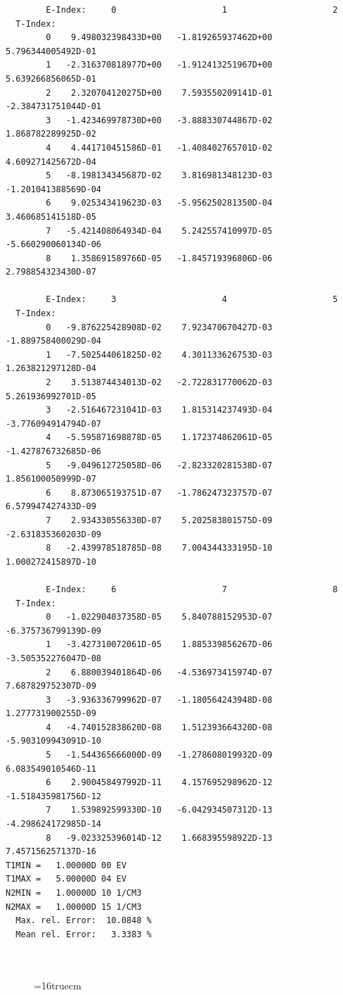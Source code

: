 \documentclass[12pt,dvipdfmx]{article}
\begin{document}
\begin{small}\begin{verbatim}
        E-Index:     0                     1                     2
  T-Index:
        0    9.498032398433D+00   -1.819265937462D+00    5.796344005492D-01
        1   -2.316370818977D+00   -1.912413251967D+00    5.639266856065D-01
        2    2.320704120275D+00    7.593550209141D-01   -2.384731751044D-01
        3   -1.423469978730D+00   -3.888330744867D-02    1.868782289925D-02
        4    4.441710451586D-01   -1.408402765701D-02    4.609271425672D-04
        5   -8.198134345687D-02    3.816981348123D-03   -1.201041388569D-04
        6    9.025343419623D-03   -5.956250281350D-04    3.460685141518D-05
        7   -5.421408064934D-04    5.242557410997D-05   -5.660290060134D-06
        8    1.358691589766D-05   -1.845719396806D-06    2.798854323430D-07

        E-Index:     3                     4                     5
  T-Index:
        0   -9.876225428908D-02    7.923470670427D-03   -1.889758400029D-04
        1   -7.502544061825D-02    4.301133626753D-03    1.263821297128D-04
        2    3.513874434013D-02   -2.722831770062D-03    5.261936992701D-05
        3   -2.516467231041D-03    1.815314237493D-04   -3.776094914794D-07
        4   -5.595871698878D-05    1.172374862061D-05   -1.427876732685D-06
        5   -9.049612725058D-06   -2.823320281538D-07    1.856100050999D-07
        6    8.873065193751D-07   -1.786247323757D-07    6.579947427433D-09
        7    2.934330556330D-07    5.202583801575D-09   -2.631835360203D-09
        8   -2.439978518785D-08    7.004344333195D-10    1.000272415897D-10

        E-Index:     6                     7                     8
  T-Index:
        0   -1.022904037358D-05    5.840788152953D-07   -6.375736799139D-09
        1   -3.427310072061D-05    1.885339856267D-06   -3.505352276047D-08
        2    6.880039401864D-06   -4.536973415974D-07    7.687829752307D-09
        3   -3.936336799962D-07   -1.180564243948D-08    1.277731900255D-09
        4   -4.740152838620D-08    1.512393664320D-08   -5.903109943091D-10
        5   -1.544365666000D-09   -1.278608019932D-09    6.083549010546D-11
        6    2.900458497992D-11    4.157695298962D-12   -1.518435981756D-12
        7    1.539892599330D-10   -6.042934507312D-13   -4.298624172985D-14
        8   -9.023325396014D-12    1.668395598922D-13    7.457156257137D-16
T1MIN =   1.00000D 00 EV
T1MAX =   5.00000D 04 EV
N2MIN =   1.00000D 10 1/CM3
N2MAX =   1.00000D 15 1/CM3
  Max. rel. Error:  10.0848 %
  Mean rel. Error:   3.3383 %



\end{verbatim}\end{small}
\begin{figure} \label{2.3.6il1}
\epsfxsize=16truecm
\end{figure}
\newpage
\end{document}
